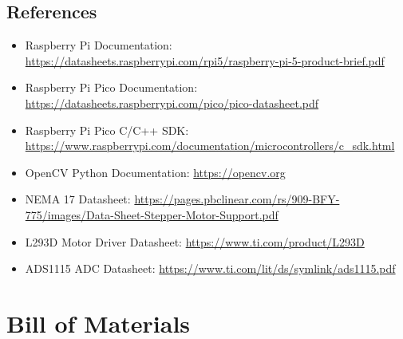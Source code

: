\subsection{References}
\begin{itemize}
    \item Raspberry Pi Documentation: \url{https://datasheets.raspberrypi.com/rpi5/raspberry-pi-5-product-brief.pdf}
    \item Raspberry Pi Pico Documentation: \url{https://datasheets.raspberrypi.com/pico/pico-datasheet.pdf}
    \item Raspberry Pi Pico C/C++ SDK: \url{https://www.raspberrypi.com/documentation/microcontrollers/c_sdk.html}
    \item OpenCV Python Documentation: \url{https://opencv.org}
    \item NEMA 17 Datasheet: \url{https://pages.pbclinear.com/rs/909-BFY-775/images/Data-Sheet-Stepper-Motor-Support.pdf}
    \item L293D Motor Driver Datasheet: \url{https://www.ti.com/product/L293D}
    \item ADS1115 ADC Datasheet: \url{https://www.ti.com/lit/ds/symlink/ads1115.pdf}
\end{itemize}

\section{Bill of Materials}

